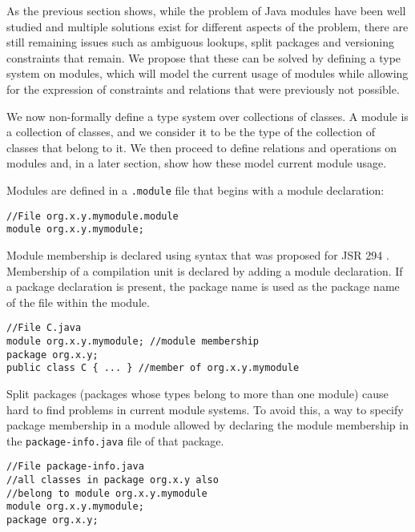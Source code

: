 
As the previous section shows, while the problem of Java modules have been
well studied and multiple solutions exist for different aspects of the problem,
there are still remaining issues such as ambiguous lookups, split packages and
versioning constraints that remain. We propose that these can be solved by
defining a type system on modules, which will model the current usage
of modules while allowing for the expression of constraints and relations
that were previously not possible.

We now non-formally define a type system over collections of classes. 
A module is a collection of classes, and we consider it to be the type of 
the collection of classes that belong to it. We then proceed to define
relations and operations on modules and, in a later section, show how
these model current module usage.


Modules are defined in a {\tt .module} file that begins with a module
declaration:

\begin{lstlisting}
//File org.x.y.mymodule.module
module org.x.y.mymodule;
\end{lstlisting}

Module membership is declared using syntax that was proposed 
for JSR 294 \cite{superpackageChange}. Membership of a compilation unit is 
declared by adding a module declaration. If a package declaration is present, 
the package name is used as the package name of the file within the module.

\begin{lstlisting}
//File C.java
module org.x.y.mymodule; //module membership
package org.x.y;
public class C { ... } //member of org.x.y.mymodule
\end{lstlisting}

Split packages (packages whose types belong to more than one module) cause hard to 
find problems in current module systems\cite{iJAMComments}. To avoid this, 
a way to specify package membership in a module allowed by declaring the module membership
in the {\tt package-info.java} file of that package.

\begin{lstlisting}
//File package-info.java
//all classes in package org.x.y also
//belong to module org.x.y.mymodule
module org.x.y.mymodule;
package org.x.y;
\end{lstlisting}

